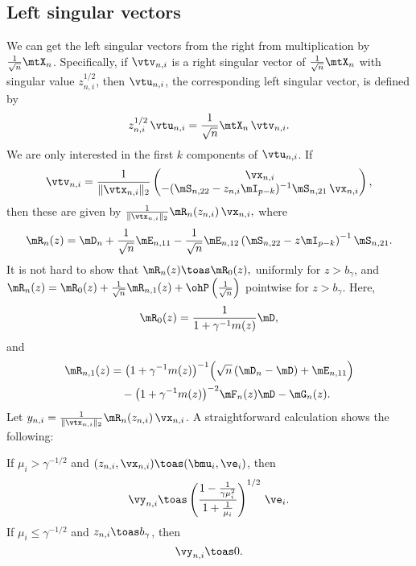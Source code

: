 \subsection{Left singular vectors}

We can get the left singular vectors from the right from multiplication
by $\frac{1}{\sqrt{n}} \mtX_n$.  Specifically, if $\vtv_{n,i}$ is a right
singular vector of $\frac{1}{\sqrt{n}} \mtX_n$ with singular value
$z_{n,i}^{1/2}$, then $\vtu_{n,i}$, the corresponding left singular vector,
is defined by
\[
    z_{n,i}^{1/2} \,
    \vtu_{n,i}
        = 
        \frac{1}{\sqrt{n}}
        \mtX_n \,
        \vtv_{n,i}.
\]
We are only interested in the first $k$ components of $\vtu_{n,i}$.  If
\[
    \vtv_{n,i}
    =
    \frac{1}{\| \vtx_{n,i} \|_2 }
    \left(
    \begin{matrix}
        \vx_{n,i} \\
        -( \mS_{n,22} - z_{n,i} \mI_{p-k} )^{-1} \mS_{n,21} \, \vx_{n,i}
    \end{matrix}
    \right),
\]
then these are given by
\(
    \frac{1}{\| \vtx_{n,i} \|_2 } \mR_n(z_{n,i}) \, \vx_{n,i},
\)
where
\[
    \mR_n(z)
    =
    \mD_n 
    + 
    \frac{1}{\sqrt{n}}
    \mE_{n,11}
    - 
    \frac{1}{\sqrt{n}}
    \mE_{n,12}
    \left( \mS_{n,22} - z \mI_{p-k} \right)^{-1}
    \mS_{n,21}.
\]
It is not hard to show that
\(
    \mR_n(z) \toas \mR_0(z),
\)
uniformly for $z > b_\gamma$, and
\(
    \mR_n(z) 
        = 
            \mR_0(z) 
            + 
            \frac{1}{\sqrt{n}} \mR_{n,1}(z) 
            + 
            \ohP\left( \frac{1}{\sqrt{n}} \right)
\)
pointwise for $z > b_\gamma$.  Here,
\[
    \mR_0(z) = \frac{1}{ 1 + \gamma^{-1} m(z) } \mD,
\]
and
\[
    \begin{split}
    \mR_{n,1}(z)
    &=
    \big( 1 + \gamma^{-1} m(z) \big)^{-1}
    \Big(
        \sqrt{n} \left( \mD_n  - \mD \right)
        +
        \mE_{n,11}
    \Big) \\
    &\quad- 
    \big( 1 + \gamma^{-1} m(z) \big)^{-2}
    \mF_{n}(z) \mD
    - 
    \mG_n(z).
    \end{split}
\]
Let $y_{n,i} = \frac{1}{\| \vtx_{n,i} \|_2 } \mR_n(z_{n,i}) \, \vx_{n,i}$.
A straightforward calculation shows the following:

\begin{lemma}
    If $\mu_i > \gamma^{-1/2}$ and 
    $(z_{n,i}, \vx_{n,i}) \toas (\bmu_i, \ve_i)$, then 
    \[
        \vy_{n,i}
            \toas
                \left(
                \frac{1 - \tfrac{ 1 }{ \gamma \mu_i^2 } }
                     { 1 + \tfrac{1}{\mu_i} } \right)^{1/2} \,
                \ve_i .
    \]
    If $\mu_i \leq \gamma^{-1/2}$ and $z_{n,i} \toas b_\gamma$, then
    \[
        \vy_{n,i} \toas 0.
    \]
\end{lemma}

